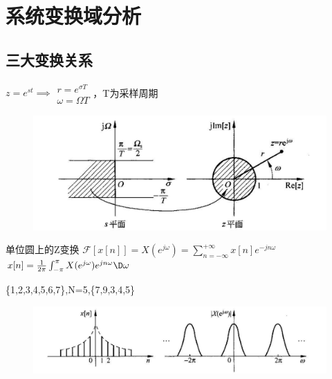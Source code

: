 \section{系统变换域分析}

\subsection{三大变换关系}
\vspace{-3pt}
\begin{description}
\tightlist

\item[z-s映射] \(z = e^{st}\implies\begin{array}{c} r = e^{\sigma T} \\ \omega = \Omega T \end{array}\)，T为采样周期

\vspace{-15pt}
\begin{figure}[H]
    \centering
    \includegraphics[width=\linewidth]{figure/IMG_48876557BC44-1.jpeg}
\end{figure}
\vspace{-15pt}

\item[DTFT] 单位圆上的Z变换
\(\mathcal F[x[n]] = X(e^{j\omega}) = \sum_{n=-\infty}^{+\infty} x[n] e^{-jn\omega}\)
\(x[n] = \frac{1}{2\pi} \int_{-\pi}^{\pi} X(e^{j\omega})e^{jn\omega}\D\omega\)

\{1,2,3,4,5,6,7\},N=5,\{7,9,3,4,5\}

\vspace{-10pt}
\begin{figure}[H]
    \centering
    \includegraphics[width=\linewidth]{figure/IMG_CC52E79B1DEA-1.jpeg}
\end{figure}
\vspace{-20pt}

\end{description}


